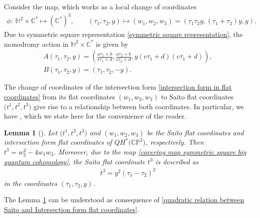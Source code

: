 \documentclass[11pt]{article}
\numberwithin{equation}{section}
\numberwithin{equation}{section}
\newtheorem{Lemma}[Theorem]{Lemma}
\begin{document}
Consider the map, which works as a local change of coordinates
\begin{gather}
\phi\colon\ \mathbb{H}^2\times \mathbb{C}^{*}\mapsto {(\mathbb{C}^{*})}^3, \qquad (\tau_1,\tau_2,y)\mapsto (w_1,w_2,w_3) =(\tau_1\tau_2y,(\tau_1+\tau_2)y,y).\label{covering map symmetric square big quantum cohomology}
\end{gather}
Due to symmetric square representation \eqref{symmetric square representation}, the monodromy action in $\mathbb{H}^2\times \mathbb{C}^{*}$ is given by
\begin{gather}
A(\tau_1,\tau_2,y)=\left( \frac{a\tau_1+b}{c\tau_1+d}, \frac{a\tau_2+b}{c\tau_2+d}, y(c\tau_1+d)(c\tau_1+d)\right),\nonumber\\
B(\tau_1,\tau_2,y)=(\tau_1,\tau_2,-y).\label{diagonal action of PSL2Z times a1}
\end{gather}

The change of coordinates of the intersection form \eqref{intersection form in flat coordinates} from its flat coordinates $(w_1,w_2,w_3)$ to Saito flat coordinates $\bigl(t^1,t^2,t^3\bigr)$ give rise to a relationship between both coordinates. In particular, we have \cite[Lemma 5.9]{Milanov}, which we state here for the convenience of the reader.

\begin{Lemma}[{\cite{Milanov}}]\label{lemma quadratic relations Milanov}
Let $\bigl(t^1,t^2,t^3\bigr)$ and $(w_1,w_2,w_3)$ be the Saito flat coordinates and intersection form flat coordinates of $QH^{*}\bigl(\mathbb{CP}^2\bigr)$, respectively. Then
$
t^3=w_2^2-4w_1w_3$.
Moreover, due to the map \eqref{covering map symmetric square big quantum cohomology}, the Saito flat coordinate $t^3$ is described as
\begin{gather}\label{t3 change of coordinate 2}
 t^3=y^2(\tau_1-\tau_2 )^2
\end{gather}
in the coordinates $(\tau_1,\tau_2,y)$.
\end{Lemma}

\begin{Remark}
The Lemma \ref{lemma quadratic relations Milanov} can be understood as consequence of \eqref{quadratic relation between Saito and Intersection form flat coordinates}.

\end{Remark}
\end{document}

